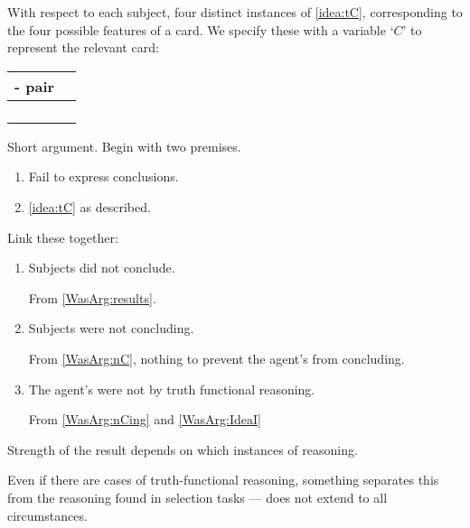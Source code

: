 \begin{note}
  With respect to each subject, four distinct instances of \autoref{idea:tC}, corresponding to the four possible features of a card.
  We specify these with a variable `\(C\)' to represent the relevant card:

  \begin{center}
    \begin{tabular}{R{.45\textwidth} L{.45\textwidth}}
      - pair &  \\
      \hline
       &  \\
       &  \\
       &  \\
       &  \\
    \end{tabular}
  \end{center}

  \noindent%
  Short argument.
  Begin with two premises.

  \begin{enumerate}[label=\Alph*., ref=(\Alph*), noitemsep]
  \item
    \label{WasArg:results}
    Fail to express conclusions.
  \item
    \label{WasArg:IdeaI}
    \autoref{idea:tC} as described.
  \end{enumerate}

  Link these together:

  \begin{enumerate}[label=\arabic*., ref=(\arabic*), noitemsep]
  \item
    \label{WasArg:nC}
    Subjects did not conclude.

    From \ref{WasArg:results}.
  \item
    \label{WasArg:nCing}
    Subjects were not concluding.

    From \ref{WasArg:nC}, nothing to prevent the agent's from concluding.
  \item
    \label{WasArg:Done}
    The agent's were not \tCV{} by truth functional reasoning.

    From \ref{WasArg:nCing} and \ref{WasArg:IdeaI}
  \end{enumerate}

  Strength of the result depends on which instances of reasoning.

  {
    \color{red}

    Even if there are cases of truth-functional reasoning, something separates this from the reasoning found in selection tasks --- does not extend to all circumstances.
  }
\end{note}

